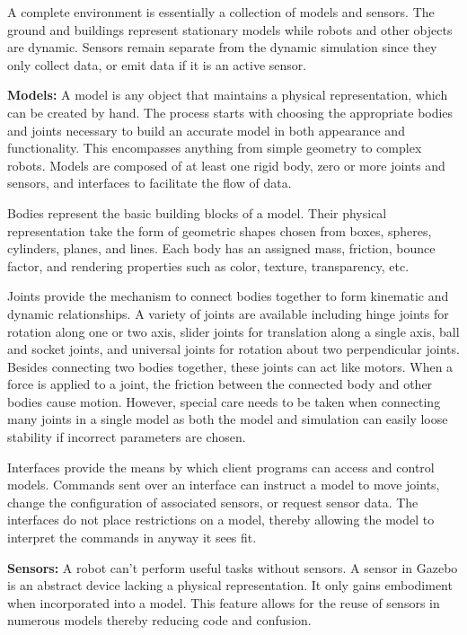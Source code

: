 A complete environment is essentially a collection of models and sensors. The ground and buildings represent stationary models while robots and other objects are dynamic. Sensors remain separate from the dynamic simulation since they only collect data, or emit data if it is an active sensor.

\textbf{Models:} A model is any object that maintains a physical representation, which can be created by hand. The process starts with choosing the appropriate bodies and joints necessary to build an accurate model in both appearance and functionality. This encompasses anything from simple geometry to complex robots. Models are composed of at least one rigid body, zero or more joints and sensors, and interfaces to facilitate the flow of data.

Bodies represent the basic building blocks of a model. Their physical representation take the form of geometric shapes chosen from boxes, spheres, cylinders, planes, and lines. Each body has an assigned mass, friction, bounce factor, and rendering properties such as color, texture, transparency, etc.

Joints provide the mechanism to connect bodies together to form kinematic and dynamic relationships. A variety of joints are available including hinge joints for rotation along one or two axis, slider joints for translation along a single axis, ball and socket joints, and universal joints for rotation about two perpendicular joints. Besides connecting two bodies together, these joints can act like motors. When a force is applied to a joint, the friction between the connected body and other bodies cause motion. However, special care needs to be taken when connecting many joints in a single model as both the model and simulation can easily loose stability if incorrect parameters are chosen.

Interfaces provide the means by which client programs can access and control models. Commands sent over an interface can instruct a model to move joints, change the configuration of associated sensors, or request sensor data. The interfaces do not place restrictions on a model, thereby allowing the model to interpret the commands in anyway it sees fit.

\textbf{Sensors:} A robot can't perform useful tasks without sensors. A sensor in Gazebo is an abstract device lacking a physical representation. It only gains embodiment when incorporated into a model. This feature allows for the reuse of sensors in numerous models thereby reducing code and confusion.

